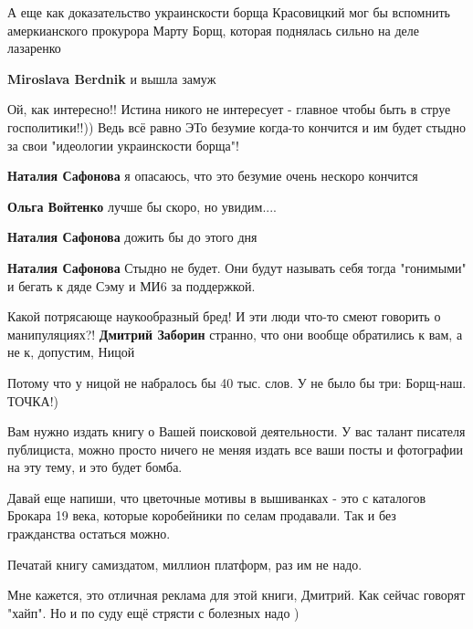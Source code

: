 \begin{itemize}
А еще как доказательство украинскости борща Красовицкий мог бы вспомнить
амеркианского прокурора Марту Борщ, которая поднялась сильно на деле лазаренко

\begin{itemize} %
\textbf{Miroslava Berdnik} и вышла замуж
\end{itemize} %


Ой, как интересно!! Истина никого не интересует - главное чтобы быть в струе
госполитики!!)) Ведь всё равно ЭТо безумие когда-то кончится и им будет стыдно
за свои "идеологии украинскости борща"!

\begin{itemize} %
\textbf{Наталия Сафонова} я опасаюсь, что это безумие очень нескоро кончится

\textbf{Ольга Войтенко} лучше бы скоро, но увидим....

\textbf{Наталия Сафонова} дожить бы до этого дня

\textbf{Наталия Сафонова} Стыдно не будет. Они будут называть себя тогда "гонимыми" и бегать к дяде Сэму и МИ6 за поддержкой.
\end{itemize} %


Какой потрясающе наукообразный бред! И эти люди что-то смеют говорить о
манипуляциях?! \textbf{Дмитрий Заборин} странно, что они вообще обратились к вам, а не
к, допустим, Ницой

\begin{itemize} %
Потому что у ницой не набралось бы 40 тыс. слов. У не было бы три: Борщ-наш. ТОЧКА!)
\end{itemize} %

Вам нужно издать книгу о Вашей поисковой деятельности. У вас талант писателя публициста, можно просто ничего не меняя издать все ваши посты и фотографии на эту тему, и это будет бомба.

Давай еще напиши, что цветочные мотивы в вышиванках - это с каталогов Брокара 19 века, которые коробейники по селам продавали. Так и без гражданства остаться можно.

Печатай книгу самиздатом, миллион платформ, раз им не надо.

Мне кажется, это отличная реклама для этой книги, Дмитрий. Как сейчас говорят "хайп". Но и по суду ещё стрясти с болезных надо )


\end{itemize}
